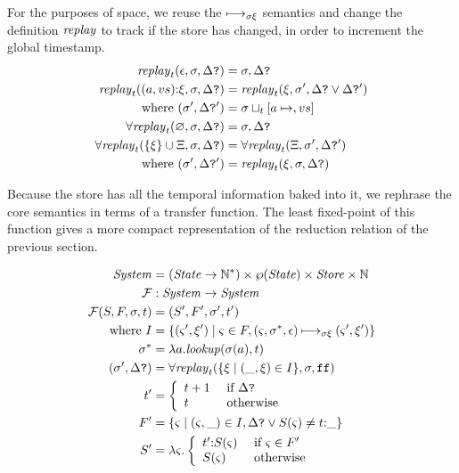\documentclass[preprint,onecolumn,9pt]{sigplanconf} %
\begin{document}
For the purposes of space, we reuse the $\mathbin{\longmapsto_{\mathit{\sigma\xi}}}$ semantics and change the definition $\mathit{replay}$ to track if the store has changed, in order to increment the global timestamp.
\begin{align*}
\mathit{replay}_t(\epsilon,\sigma,\Delta\mbox{{\tt ?}}) &= \sigma,\Delta\mbox{{\tt ?}} \\
\mathit{replay}_t((a, v{s}) {\tt :} \xi,\sigma,\Delta\mbox{{\tt ?}}) &= \mathit{replay}_t(\xi,\sigma',\Delta\mbox{{\tt ?}} \vee \Delta\mbox{{\tt ?}}') \\
\text{ where } (\sigma',\Delta\mbox{{\tt ?}}') &= \sigma\sqcup_t[a \mapsto, v{s}] \\
\forall\mathit{replay}_t(\varnothing,\sigma,\Delta\mbox{{\tt ?}}) &= \sigma,\Delta\mbox{{\tt ?}} \\
\forall\mathit{replay}_t(\{\xi\}\cup\Xi,\sigma,\Delta\mbox{{\tt ?}}) &= \forall\mathit{replay}_t(\Xi, \sigma', \Delta\mbox{{\tt ?}}') \\
\text{ where } (\sigma',\Delta\mbox{{\tt ?}}') &= \mathit{replay}_t(\xi,\sigma,\Delta\mbox{{\tt ?}})
\end{align*}

Because the store has all the temporal information baked into it, we
rephrase the core semantics in terms of a transfer function. The least
fixed-point of this function gives a more compact representation of
the reduction relation of the previous section.

\begin{align*}
\mathit{System} &= (\mathit{State} \to {{\mathbb N}}^*) \times \wp(\mathit{State}) \times \mathit{Store} \times {\mathbb N} \\
{\mathcal F} &: \mathit{System} \to \mathit{System} \\
{\mathcal F}(S,F, \sigma,t) &= (S',F',\sigma', t') \\
\text{ where }
I &= \{(\varsigma',\xi') \mid
       \varsigma \in F,
       (\varsigma,\sigma^*,\epsilon) \mathbin{\longmapsto_{\mathit{\sigma\xi}}}
       (\varsigma',\xi')\} \\
\sigma^* &= \lambda a.\mathit{lookup}(\sigma(a),t) \\
(\sigma',\Delta\mbox{{\tt ?}}) &= \forall\mathit{replay}_t(\{\xi \mid (\_,\xi) \in I\},\sigma,{\tt ff}) \\
t' &= \left\{\begin{array}{ll} t+1 & \text{ if } \Delta\mbox{{\tt ?}} \\
              t   & \text{ otherwise}
             \end{array}\right. \\
F' &= \{\varsigma \mid (\varsigma,\_) \in I, \Delta\mbox{{\tt ?}} \vee S(\varsigma) \neq t {\tt :} \_\} \\
S' &= \lambda \varsigma. \left\{\begin{array}{ll}
                               t' {\tt :} S(\varsigma) & \text{ if } \varsigma \in F' \\
                               S(\varsigma) & \text{ otherwise}
                             \end{array}\right.
\end{align*}
\end{document}
